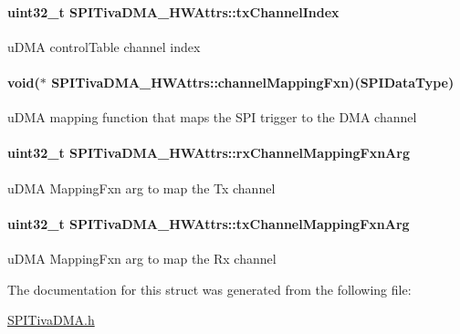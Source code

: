 \paragraph[{tx\-Channel\-Index}]{\setlength{\rightskip}{0pt plus 5cm}uint32\-\_\-t S\-P\-I\-Tiva\-D\-M\-A\-\_\-\-H\-W\-Attrs\-::tx\-Channel\-Index}\label{struct_s_p_i_tiva_d_m_a___h_w_attrs_af2833557c6725d3edf86b4f72543cf1c}
u\-D\-M\-A control\-Table channel index 
\paragraph[{channel\-Mapping\-Fxn}]{\setlength{\rightskip}{0pt plus 5cm}void($\ast$ S\-P\-I\-Tiva\-D\-M\-A\-\_\-\-H\-W\-Attrs\-::channel\-Mapping\-Fxn)({\bf S\-P\-I\-Data\-Type})}\label{struct_s_p_i_tiva_d_m_a___h_w_attrs_a87b72b6ad1c1346a49dccc386b406d6e}
u\-D\-M\-A mapping function that maps the S\-P\-I trigger to the D\-M\-A channel 
\paragraph[{rx\-Channel\-Mapping\-Fxn\-Arg}]{\setlength{\rightskip}{0pt plus 5cm}uint32\-\_\-t S\-P\-I\-Tiva\-D\-M\-A\-\_\-\-H\-W\-Attrs\-::rx\-Channel\-Mapping\-Fxn\-Arg}\label{struct_s_p_i_tiva_d_m_a___h_w_attrs_abae80f97226457864feb654117217f66}
u\-D\-M\-A Mapping\-Fxn arg to map the Tx channel 
\paragraph[{tx\-Channel\-Mapping\-Fxn\-Arg}]{\setlength{\rightskip}{0pt plus 5cm}uint32\-\_\-t S\-P\-I\-Tiva\-D\-M\-A\-\_\-\-H\-W\-Attrs\-::tx\-Channel\-Mapping\-Fxn\-Arg}\label{struct_s_p_i_tiva_d_m_a___h_w_attrs_a58b59e083a9e324970d63c46f3342afe}
u\-D\-M\-A Mapping\-Fxn arg to map the Rx channel 

The documentation for this struct was generated from the following file\-:\begin{DoxyCompactItemize}
\item 
\hyperlink{_s_p_i_tiva_d_m_a_8h}{S\-P\-I\-Tiva\-D\-M\-A.\-h}\end{DoxyCompactItemize}
